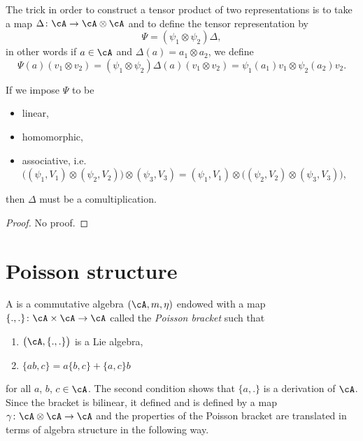 The trick in order to construct a tensor product of two representations is to take a map $\Delta\colon \cA\to \cA\otimes\cA$ and to define the tensor representation by
\begin{equation}
\Psi=(\psi_1\otimes\psi_2)\Delta,
\end{equation}
in other words if $a\in\cA$ and $\Delta(a)=a_1\otimes a_2$, we define
\begin{equation}
\Psi(a)(v_1\otimes v_2)=(\psi_1\otimes\psi_2)\Delta(a)(v_1\otimes v_2)=\psi_1(a_1)v_1\otimes\psi_2(a_2)v_2.
\end{equation}

\begin{proposition}
If we impose $\Psi$ to be 
\begin{itemize}
\item linear,
\item homomorphic,
\item associative, i.e. $\big((\psi_1,V_1)\otimes(\psi_2,V_2)\big)\otimes(\psi_3,V_3)=(\psi_1,V_1)\otimes\big( (\psi_2,V_2)\otimes(\psi_3,V_3)\big)$,
\end{itemize}
then $\Delta$ must be a comultiplication. 
\end{proposition}
\begin{proof}
No proof.
\end{proof}

\section{Poisson structure}

A  is a commutative algebra $(\cA,m,\eta)$ endowed with a map $\{ .,. \}\colon \cA\times\cA\to \cA$ called the \emph{Poisson bracket} such that
\begin{enumerate}
\item $\big( \cA,\{ .,. \} \big)$ is a Lie algebra,
\item $\{ ab,c \}=a\{ b,c \}+\{ a,c \}b$
\end{enumerate}
for all $a$, $b$, $c\in\cA$. The second condition shows that $\{ a,. \}$ is a derivation of $\cA$. Since the bracket is bilinear, it defined and is defined by a map $\gamma\colon \cA\otimes\cA\to \cA$ and the properties of the Poisson bracket are translated in terms of algebra structure in the following way.

